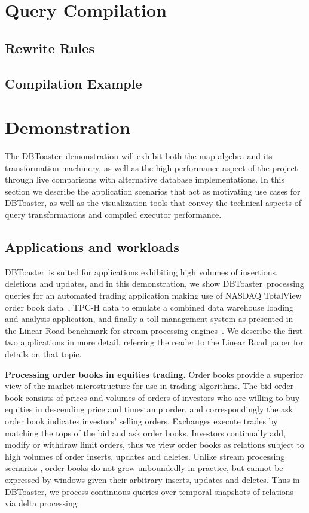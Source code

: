 \documentclass{vldb}
\newcommand{\compiler}{DBToaster}
\begin{document}
\section{Query Compilation}

\subsection{Rewrite Rules}

\subsection{Compilation Example}

\section{Demonstration}
The \compiler\ demonstration will exhibit both the map algebra and its
transformation machinery, as well as the high performance aspect of the
project through live comparisons with alternative database implementations.
In this section we describe the application scenarios that act as motivating
use cases for \compiler, as well as the visualization tools that convey the
technical aspects of query transformations and compiled executor performance.

\subsection{Applications and workloads}
\compiler\ is suited for applications exhibiting high volumes of insertions,
deletions and updates, and in this demonstration, we show \compiler\ processing
queries for an automated trading application making use of NASDAQ TotalView order
book data~\cite{totalview-url}, TPC-H data to emulate a combined data warehouse
loading and analysis application, and finally a toll management system as
presented in the Linear Road benchmark for stream processing
engines~\cite{arasu-vldb:04}. We describe the first two applications in more
detail, referring the reader to the Linear Road paper for details on that topic.

\textbf{Processing order books in equities trading.}
Order books provide a superior view of the market microstructure for use in
trading algorithms. The bid order book consists of prices and volumes of orders
of investors who are willing to buy equities in descending price and timestamp
order, and correspondingly the ask order book indicates investors' selling
orders. Exchanges execute trades by matching the tops of the bid and ask order
books. Investors continually add, modify or withdraw limit orders, thus we view
order books as relations subject to high volumes of order inserts, updates and
deletes. Unlike stream processing scenarios \cite{motwani-cidr:03}, order
books do not grow unboundedly in practice, but cannot be expressed by windows
given their arbitrary inserts, updates and deletes. Thus in \compiler, we process
continuous queries over temporal snapshots of relations via delta processing.
\end{document}
